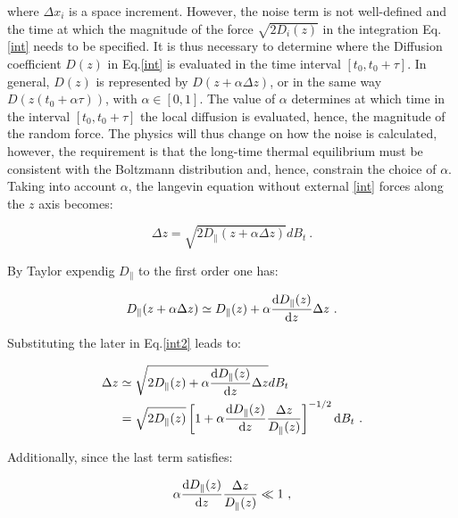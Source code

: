 where $\Delta x_i$ is a space increment. However, the noise term is not well-defined and the time at which the magnitude of the force $\sqrt{2D_i(z)}$ in the integration Eq.\ref{int} needs to be specified. It is thus necessary to determine where the Diffusion coefficient $D(z)$ in Eq.\ref{int} is evaluated in the time interval $[t_0, t_0 + \tau]$. In general, $D(z)$ is represented by $D(z + \alpha \Delta z)$, or in the same way $D(z(t_0 + \alpha \tau))$, with $\alpha \in [0,1]$. The value of $\alpha$ determines at which time in the interval   $[t_0, t_0 + \tau]$ the local diffusion is evaluated, hence, the magnitude of the random force. The physics will thus change on how the noise is calculated, however, the requirement is that the long-time thermal equilibrium must be consistent with the Boltzmann distribution and, hence, constrain the choice of $\alpha$. Taking into account $\alpha$, the langevin equation without external \ref{int} forces along the $z$ axis becomes:

\begin{equation}
	\Delta z  = \sqrt{2D_\parallel (z + \alpha \Delta z)} d B_t ~.
	\label{int2}
\end{equation}

By Taylor expendig $D_ \parallel$ to the first order one has:

\begin{equation}
	D_\parallel (z + \alpha \Delta z) \simeq D_\parallel (z)  + \alpha \frac{\textnormal{d} D_\parallel(z)}{\textnormal{d}z} \Delta z ~.
\end{equation}

Substituting the later in Eq.\ref{int2} leads to:

\begin{equation}
	\begin{aligned}
		\Delta z &\simeq \sqrt{2D_\parallel (z)  + \alpha \frac{\textnormal{d} D_\parallel(z)}{\textnormal{d}z} \Delta z} d B_t  \\
		& = \sqrt{2D_\parallel (z)} \left[1 + \alpha \frac{\textnormal{d} D_\parallel(z)}{\textnormal{d}z} \frac{\Delta z }{D_\parallel(z)}\right] ^{-1/2} \textnormal{d} B_t  ~.
	\end{aligned}
	\label{int3}
\end{equation}

Additionally, since the last term satisfies:

\begin{equation}
	\alpha \frac{\textnormal{d} D_\parallel(z)}{\textnormal{d}z} \frac{\Delta z }{D_\parallel(z)} \ll 1 ~,
\end{equation}

